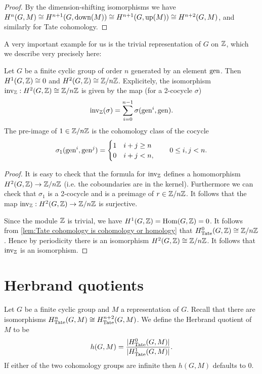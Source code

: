 \begin{proof}
	By the dimension-shifting isomorphisms we have
	$H^{n}(G,M) \cong H^{n+1}(G,\mathrm{down}(M)) \cong H^{n+1}(G,\mathrm{up}(M)) \cong H^{n+2}(G,M)$,
	and similarly for Tate cohomology.
\end{proof}



A very important example for us is the trivial representation of $G$ on ${\mathbb Z}$, which we describe
very precisely here:

\begin{lemma} \label{lem:H2 cyclic Z}
	Let $G$ be a finite cyclic group of order $n$ generated by an element $\mathrm{gen}$.
	Then $H^1(G,{\mathbb Z}) \cong 0$ and $H^2(G,{\mathbb Z}) \cong {\mathbb Z}/n{\mathbb Z}$.
	Explicitely, the isomorphism $\mathrm{inv}_{\mathbb Z} : H^2(G,{\mathbb Z}) \cong {\mathbb Z}/n{\mathbb Z}$ is given by the map
	(for a 2-cocycle $\sigma$)
	\[
		\mathrm{inv}_{\mathbb Z} (\sigma) = \sum_{i=0}^{n-1} \sigma(\mathrm{gen}^i,\mathrm{gen}).
	\]
	The pre-image of $1 \in {\mathbb Z}/n{\mathbb Z}$ is the cohomology class of the cocycle
	\[
		\sigma_1 (\mathrm{gen}^i, \mathrm{gen}^j) = \begin{cases}
			1 & i+j \ge n \\
			0 & i+j < n,
		\end{cases}
		\qquad 0 \le i,j < n.
	\]
\end{lemma}

\begin{proof}
	It is easy to check that the formula for $\mathrm{inv}_{\mathbb Z}$ defines a homomorphism
	$H^2(G,{\mathbb Z}) \to {\mathbb Z} / n {\mathbb Z}$ (i.e. the coboundaries are in the kernel).
	Furthermore we can check that $\sigma_1$ is a 2-cocycle
	and is a preimage of $r \in {\mathbb Z}/n{\mathbb Z}$. It follows that the map $\mathrm{inv}_{\mathbb Z} : H^2(G,{\mathbb Z}) \to {\mathbb Z}/n{\mathbb Z}$ is
	surjective.

	Since the module ${\mathbb Z}$ is trivial, we have $H^1(G,{\mathbb Z})= \mathrm{Hom}(G,{\mathbb Z}) = 0$.
	It follows from \ref{lem:Tate cohomology is cohomology or homology}
	that $H^0_{\mathrm{Tate}}(G,{\mathbb Z}) \cong {\mathbb Z} /n{\mathbb Z}$.
	Hence by periodicity there is an isomorphism $H^2(G,{\mathbb Z}) \cong {\mathbb Z}/ n{\mathbb Z}$.
	It follows that $\mathrm{inv}_{\mathbb Z}$ is an isomorphism.
\end{proof}





\section{Herbrand quotients}

\begin{definition} \label{def:herbrand quotient}
	Let $G$ be a finite cyclic group and $M$ a representation of $G$.
	Recall that there are isomorphisms $H^n_{\mathrm{Tate}}(G,M) \cong H^{n+2}_{\mathrm{Tate}}(G,M)$.
	We define the Herbrand quotient of $M$ to be
	\[
		h(G,M) = \frac{|H^0_{\mathrm{Tate}}(G,M)|}{|H^1_{\mathrm{Tate}}(G,M)|}.
	\]
	If either of the two cohomology groups are infinite then $h(G,M)$ defaults to $0$.
\end{definition}

